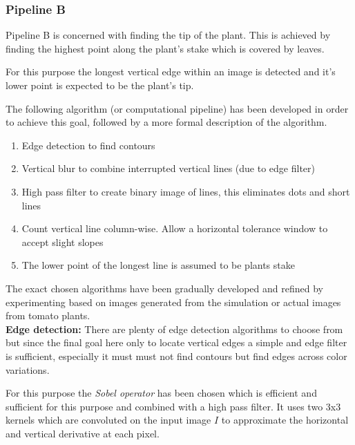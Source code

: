 \subsubsection{Pipeline B}

Pipeline B is concerned with finding the tip of the plant.
This is achieved by finding the highest point along the plant's stake which is covered by leaves.

For this purpose the longest vertical edge within an image is detected and it's lower point is
expected to be the plant's tip.

The following algorithm (or computational pipeline) has been developed in order to achieve this goal,
followed by a more formal description of the algorithm.

\begin{enumerate}
    \setlength{\itemsep}{0pt}
    \setlength{\parskip}{0pt}
    \item Edge detection to find contours
    \item Vertical blur to combine interrupted vertical lines (due to edge filter)
    \item High pass filter to create binary image of lines, this eliminates dots and short lines
    \item Count vertical line column-wise. Allow a horizontal tolerance window to accept slight slopes
    \item The lower point of the longest line is assumed to be plants stake
\end{enumerate}

The exact chosen algorithms have been gradually developed and refined by experimenting
based on images generated from the simulation or actual images from tomato plants.\\

\textbf{Edge detection:} There are plenty of edge detection algorithms to choose from but since
the final goal here only to locate vertical edges a simple and edge filter is sufficient, especially
it must must not find contours but find edges across color variations.

For this purpose the \textit{Sobel operator} has been chosen which is efficient and sufficient
for this purpose and combined with a high pass filter.
It uses two 3x3 kernels which are convoluted on the input image $I$ to approximate the horizontal
and vertical derivative at each pixel.\\

